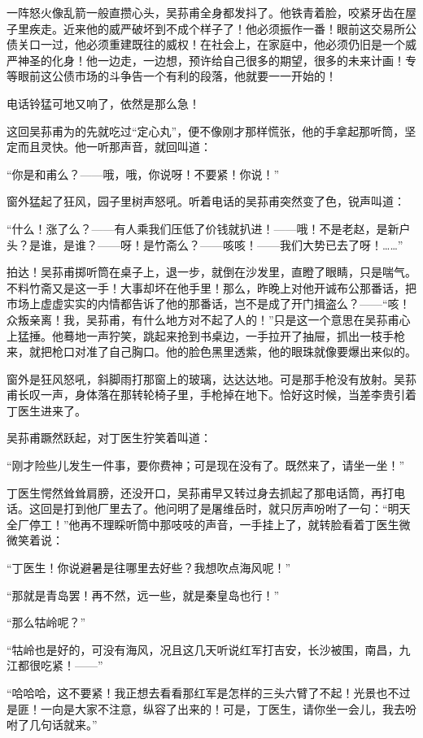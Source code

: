 \par 一阵怒火像乱箭一般直攒心头，吴荪甫全身都发抖了。他铁青着脸，咬紧牙齿在屋子里疾走。近来他的威严破坏到不成个样子了！他必须振作一番！眼前这交易所公债关口一过，他必须重建既往的威权！在社会上，在家庭中，他必须仍旧是一个威严神圣的化身！他一边走，一边想，预许给自己很多的期望，很多的未来计画！专等眼前这公债市场的斗争告一个有利的段落，他就要一一开始的！
\par 电话铃猛可地又响了，依然是那么急！
\par 这回吴荪甫为的先就吃过“定心丸”，便不像刚才那样慌张，他的手拿起那听筒，坚定而且灵快。他一听那声音，就回叫道：
\par “你是和甫么？——哦，哦，你说呀！不要紧！你说！”
\par 窗外猛起了狂风，园子里树声怒吼。听着电话的吴荪甫突然变了色，锐声叫道：
\par “什么！涨了么？——有人乘我们压低了价钱就扒进！——哦！不是老赵，是新户头？是谁，是谁？——呀！是竹斋么？——咳咳！——我们大势已去了呀！……”
\par 拍达！吴荪甫掷听筒在桌子上，退一步，就倒在沙发里，直瞪了眼睛，只是喘气。不料竹斋又是这一手！大事却坏在他手里！那么，昨晚上对他开诚布公那番话，把市场上虚虚实实的内情都告诉了他的那番话，岂不是成了开门揖盗么？——“咳！众叛亲离！我，吴荪甫，有什么地方对不起了人的！”只是这一个意思在吴荪甫心上猛捶。他蓦地一声狞笑，跳起来抢到书桌边，一手拉开了抽屉，抓出一枝手枪来，就把枪口对准了自己胸口。他的脸色黑里透紫，他的眼珠就像要爆出来似的。
\par 窗外是狂风怒吼，斜脚雨打那窗上的玻璃，达达达地。可是那手枪没有放射。吴荪甫长叹一声，身体落在那转轮椅子里，手枪掉在地下。恰好这时候，当差李贵引着丁医生进来了。
\par 吴荪甫蹶然跃起，对丁医生狞笑着叫道：
\par “刚才险些儿发生一件事，要你费神；可是现在没有了。既然来了，请坐一坐！”
\par 丁医生愕然耸耸肩膀，还没开口，吴荪甫早又转过身去抓起了那电话筒，再打电话。这回是打到他厂里去了。他问明了是屠维岳时，就只厉声吩咐了一句：“明天全厂停工！”他再不理睬听筒中那吱吱的声音，一手挂上了，就转脸看着丁医生微微笑着说：
\par “丁医生！你说避暑是往哪里去好些？我想吹点海风呢！”
\par “那就是青岛罢！再不然，远一些，就是秦皇岛也行！”
\par “那么牯岭呢？”
\par “牯岭也是好的，可没有海风，况且这几天听说红军打吉安，长沙被围，南昌，九江都很吃紧！——”
\par “哈哈哈，这不要紧！我正想去看看那红军是怎样的三头六臂了不起！光景也不过是匪！一向是大家不注意，纵容了出来的！可是，丁医生，请你坐一会儿，我去吩咐了几句话就来。”
